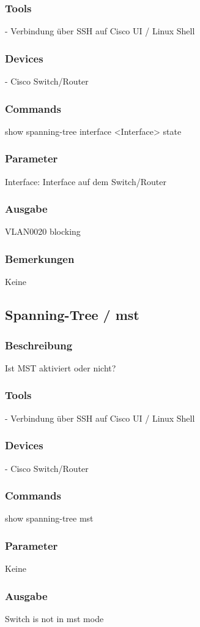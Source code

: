 \documentclass[a4,12pt]{scrartcl}
\begin{document}
\subsubsection{Tools}
- Verbindung über SSH auf Cisco UI / Linux Shell
\subsubsection{Devices}
- Cisco Switch/Router
\subsubsection{Commands}
show spanning-tree interface <Interface> state
\subsubsection{Parameter}
Interface: Interface auf dem Switch/Router
\subsubsection{Ausgabe}
VLAN0020            blocking
\subsubsection{Bemerkungen}
Keine

\subsection{Spanning-Tree / mst}
\subsubsection{Beschreibung}
Ist MST aktiviert oder nicht?
\subsubsection{Tools}
- Verbindung über SSH auf Cisco UI / Linux Shell
\subsubsection{Devices}
- Cisco Switch/Router
\subsubsection{Commands}
show spanning-tree mst
\subsubsection{Parameter}
Keine
\subsubsection{Ausgabe}
Switch is not in mst mode
\end{document}
